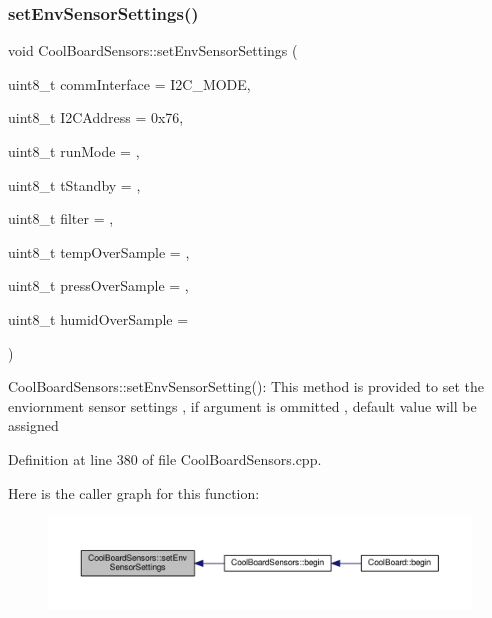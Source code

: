 \subsubsection{\texorpdfstring{set\+Env\+Sensor\+Settings()}{setEnvSensorSettings()}}
{\footnotesize\ttfamily void Cool\+Board\+Sensors\+::set\+Env\+Sensor\+Settings (\begin{DoxyParamCaption}\item[{uint8\+\_\+t}]{comm\+Interface = {\ttfamily I2C\+\_\+MODE},  }\item[{uint8\+\_\+t}]{I2\+C\+Address = {\ttfamily 0x76},  }\item[{uint8\+\_\+t}]{run\+Mode = {},  }\item[{uint8\+\_\+t}]{t\+Standby = {},  }\item[{uint8\+\_\+t}]{filter = {},  }\item[{uint8\+\_\+t}]{temp\+Over\+Sample = {},  }\item[{uint8\+\_\+t}]{press\+Over\+Sample = {},  }\item[{uint8\+\_\+t}]{humid\+Over\+Sample = {} }\end{DoxyParamCaption})}

Cool\+Board\+Sensors\+::set\+Env\+Sensor\+Setting()\+: This method is provided to set the enviornment sensor settings , if argument is ommitted , default value will be assigned 

Definition at line 380 of file Cool\+Board\+Sensors.\+cpp.

Here is the caller graph for this function\+:\nopagebreak
\begin{figure}[H]
\begin{center}
\leavevmode
\includegraphics[width=350pt]{class_cool_board_sensors_a406307ffd70272282d91479c7ed8d66f_icgraph}
\end{center}
\end{figure}
\mbox{\label{class_cool_board_sensors_ab76e6dbd6efbcc25ff460535badd8d45}} 
